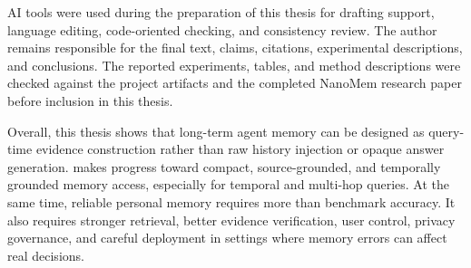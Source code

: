 AI tools were used during the preparation of this thesis for drafting support,
language editing, code-oriented checking, and consistency review. The author
remains responsible for the final text, claims, citations, experimental
descriptions, and conclusions. The reported experiments, tables, and method
descriptions were checked against the project artifacts and the completed
NanoMem research paper before inclusion in this thesis.

Overall, this thesis shows that long-term agent memory can be designed as
query-time evidence construction rather than raw history injection or opaque
answer generation. \sys{} makes progress toward compact, source-grounded, and
temporally grounded memory access, especially for temporal and multi-hop
queries. At the same time, reliable personal memory requires more than
benchmark accuracy. It also requires stronger retrieval, better evidence
verification, user control, privacy governance, and careful deployment in
settings where memory errors can affect real decisions.
